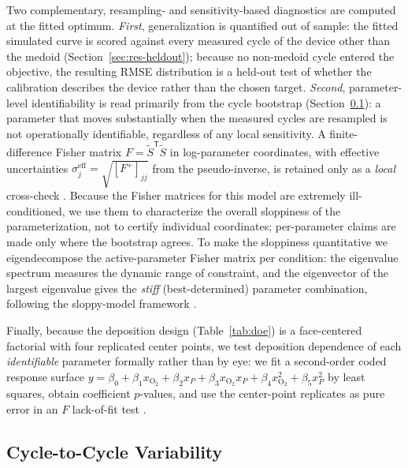 \documentclass[journal]{IEEEtran}
\begin{document}
Two complementary, resampling- and sensitivity-based diagnostics are computed
at the fitted optimum.  \emph{First}, generalization is quantified out of
sample: the fitted simulated curve is scored against every measured cycle of
the device other than the medoid (Section~\ref{sec:res-heldout}); because no
non-medoid cycle entered the objective, the resulting RMSE distribution is a
held-out test of whether the calibration describes the device rather than the
chosen target.  \emph{Second}, parameter-level identifiability is read
primarily from the cycle bootstrap (Section~\ref{sec:boot}): a parameter that
moves substantially when the measured cycles are resampled is not
operationally identifiable, regardless of any local sensitivity.  A
finite-difference Fisher matrix $F=\widetilde S^{\mathsf T}\widetilde S$ in
log-parameter coordinates, with effective uncertainties
$\sigma_j^{\mathrm{eff}}=\sqrt{[F^+]_{jj}}$ from the pseudo-inverse, is
retained only as a \emph{local} cross-check
\cite{raue2009,transtrum2015sloppiness}.  Because the Fisher matrices for this
model are extremely ill-conditioned, we use them to characterize the overall
sloppiness of the parameterization, not to certify individual coordinates;
per-parameter claims are made only where the bootstrap agrees.  To make the
sloppiness quantitative we eigendecompose the active-parameter Fisher matrix
per condition: the eigenvalue spectrum measures the dynamic range of
constraint, and the eigenvector of the largest eigenvalue gives the
\emph{stiff} (best-determined) parameter combination, following the
sloppy-model framework \cite{transtrum2015sloppiness,gutenkunst2007}.

Finally, because the deposition design (Table~\ref{tab:doe}) is a face-centered
factorial with four replicated center points, we test deposition dependence of
each \emph{identifiable} parameter formally rather than by eye: we fit a
second-order coded response surface
$y=\beta_0+\beta_1x_{\mathrm{O}_2}+\beta_2x_{P}+\beta_3x_{\mathrm{O}_2}x_{P}
+\beta_4x_{\mathrm{O}_2}^2+\beta_5x_{P}^2$
by least squares, obtain coefficient $p$-values, and use the center-point
replicates as pure error in an $F$ lack-of-fit test \cite{efron1994bootstrap}.

\subsection{Cycle-to-Cycle Variability}
\label{sec:boot}
\end{document}
